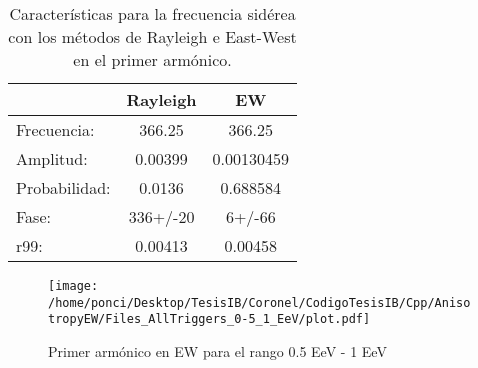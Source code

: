 \begin{table}[H]
    \begin{small}
        \begin{center}
            \begin{tabular}[c]{l|c|c}
                                & Rayleigh     & EW         \\\hline
                Frecuencia:     & 366.25	   & 366.25        \\
                Amplitud:       & 0.00399	   & 0.00130459     \\
                Probabilidad:   & 0.0136	   & 0.688584     \\
                Fase:           & 336+/-20	   & 6+/-66          \\
                r99:            & 0.00413	   & 0.00458    \\
            \end{tabular}
        \end{center}
    \end{small}
    \caption{Características para la frecuencia sidérea con los métodos de Rayleigh  e East-West en el primer armónico.}
    \label{tab:solar}
\end{table}

\begin{figure}[H]
    \begin{small}
        \begin{center}
            \texttt{[image: /home/ponci/Desktop/TesisIB/Coronel/CodigoTesisIB/Cpp/AnisotropyEW/Files\_AllTriggers\_0-5\_1\_EeV/plot.pdf]}
        \end{center}
        \caption{Primer armónico en EW para el rango 0.5 EeV - 1 EeV}
        \label{fig:}
    \end{small}
\end{figure}


